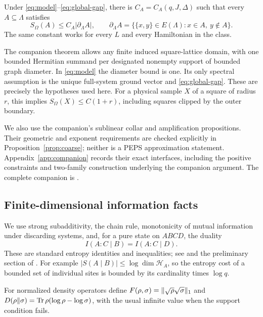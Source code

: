 \begin{proposition}
\label{prop:area-law}
Under \eqref{eq:model}--\eqref{eq:global-gap}, there is
$C_A=C_A(q,J,\Delta)$ such that every $A\subseteq\Lambda$ satisfies
\[
 S_\Omega(A)\le C_A|\partial_\Lambda A|,
 \qquad
 \partial_\Lambda A=\{\{x,y\}\in E(\Lambda):x\in A,
                                      \ y\notin A\}.
\]
The same constant works for every $L$ and every Hamiltonian in the class.
\end{proposition}

The companion theorem allows any finite induced square-lattice domain, with one
bounded Hermitian summand per designated nonempty support of bounded graph
diameter. In \eqref{eq:model} the diameter bound is one. Its only spectral
assumption is the unique full-system ground vector and
\eqref{eq:global-gap}. These are precisely the hypotheses used here.
For a physical sample $X$ of a square of radius $r$, this implies
$S_\Omega(X)\le C(1+r)$, including squares clipped by the outer boundary.

We also use the companion's sublinear collar and amplification propositions.
Their geometric and exponent requirements are checked explicitly in
Proposition~\ref{prop:coarse}; neither is a PEPS approximation statement.
Appendix~\ref{app:companion} records their exact interfaces, including the
positive constraints and two-family construction underlying the companion
argument. The complete companion is \cite{RepoAreaLaw}.

\subsection{Finite-dimensional information facts}

We use strong subadditivity, the chain rule, monotonicity of mutual
information under discarding systems, and, for a pure state on $ABCD$,
the duality
\[
 I(A:C\mid B)=I(A:C\mid D).
\]
These are standard entropy identities and inequalities; see
\cite{LiebRuskai1973} and the preliminary section of \cite{RepoAreaLaw}.
For example $|S(A\mid B)|\le\log\dim\mathcal H_A$, so the entropy cost
of a bounded set of individual sites is bounded by its cardinality times
$\log q$.

For normalized density operators define
$F(\rho,\sigma)=\lVert \sqrt\rho\sqrt\sigma\rVert_1$ and
$D(\rho\Vert\sigma)=\operatorname{Tr}\rho(\log\rho-\log\sigma)$, with the usual
infinite value when the support condition fails.

